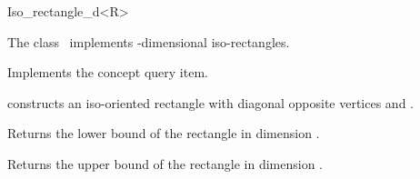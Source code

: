 

\begin{ccRefClass}{Iso_rectangle_d<R>}  %


\ccDefinition
  
The class \ccRefName\ implements -dimensional iso-rectangles.


\ccIsModel

Implements the concept query item.


\ccTypes


\ccCreation
{}  %


{constructs an iso-oriented rectangle  with diagonal opposite vertices  and }. 

\ccOperations

{Returns the lower bound of the rectangle in dimension .}

{Returns the upper bound of the rectangle in dimension .}


\end{ccRefClass}


